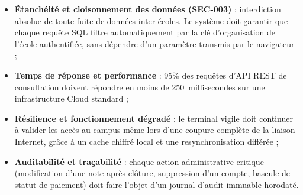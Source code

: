 \begin{itemize}
  \item \textbf{Étanchéité et cloisonnement des données (SEC-003)} : interdiction absolue de toute fuite de données inter-écoles. Le système doit garantir que chaque requête SQL filtre automatiquement par la clé d'organisation de l'école authentifiée, sans dépendre d'un paramètre transmis par le navigateur ;
  \item \textbf{Temps de réponse et performance} : 95\% des requêtes d'API REST de consultation doivent répondre en moins de 250~millisecondes sur une infrastructure Cloud standard ;
  \item \textbf{Résilience et fonctionnement dégradé} : le terminal vigile doit continuer à valider les accès au campus même lors d'une coupure complète de la liaison Internet, grâce à un cache chiffré local et une resynchronisation différée ;
  \item \textbf{Auditabilité et traçabilité} : chaque action administrative critique (modification d'une note après clôture, suppression d'un compte, bascule de statut de paiement) doit faire l'objet d'un journal d'audit immuable horodaté.
\end{itemize}
